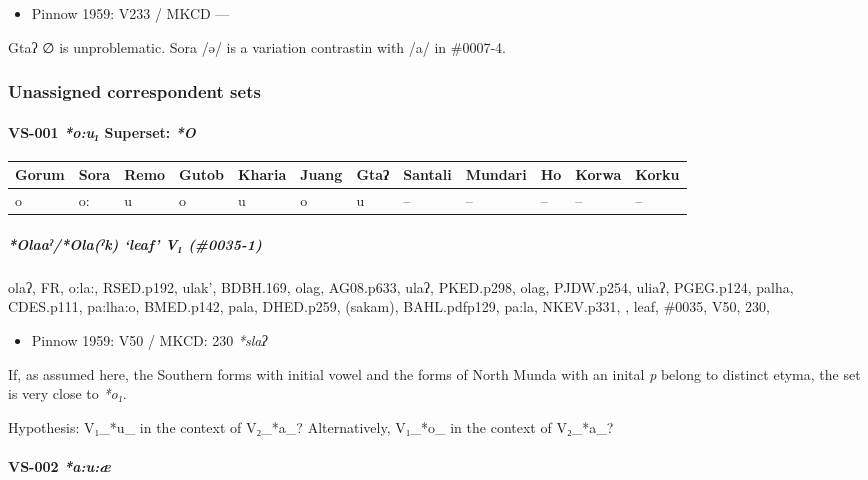 \documentclass[a4paper,]{article}
\providecommand{\tightlist}{%
  \setlength{\itemsep}{0pt}\setlength{\parskip}{0pt}}
\let\oldparagraph\paragraph
\renewcommand{\paragraph}[1]{\oldparagraph{#1}\mbox{}}
\let\oldsubparagraph\subparagraph
\renewcommand{\subparagraph}[1]{\oldsubparagraph{#1}\mbox{}}
\begin{document}
\begin{itemize}
\tightlist
\item
  Pinnow 1959: V233 / MKCD ---
\end{itemize}

Gtaʔ ∅ is unproblematic. Sora /ə/ is a variation contrastin with /a/ in
\#0007-4.

\subsubsection{Unassigned correspondent
sets}\label{unassigned-correspondent-sets}

\paragraph{\texorpdfstring{VS-001 \emph{*o:u₁} Superset:
\emph{*O}}{VS-001 *o:u₁ Superset: *O}}\label{vs-001-ou-superset-o}

\begin{longtable}[]{@{}llllllllllll@{}}
\toprule
Gorum & Sora & Remo & Gutob & Kharia & Juang & Gtaʔ & Santali & Mundari
& Ho & Korwa & Korku\tabularnewline
\midrule
\endhead
o & o: & u & o & u & o & u & -- & -- & -- & -- & --\tabularnewline
\bottomrule
\end{longtable}

\subparagraph{\texorpdfstring{\emph{*Olaaˀ}/\emph{*Ola(ˀk)} `leaf' V₁
(\#0035-1)}{*Olaaˀ/*Ola(ˀk) leaf V₁ (\#0035-1)}}\label{olaaux2c0olaux2c0k-leaf-v-0035-1}

olaʔ, FR, o:la:, RSED.p192, ulak', BDBH.169, olag, AG08.p633, ulaʔ,
PKED.p298, olag, PJDW.p254, uliaʔ, PGEG.p124, palha, CDES.p111,
pa:lha:o, BMED.p142, pala, DHED.p259, (sakam), BAHL.pdfp129, pa:la,
NKEV.p331, , leaf, \#0035, V50, 230,

\begin{itemize}
\tightlist
\item
  Pinnow 1959: V50 / MKCD: 230 \emph{*slaʔ}
\end{itemize}

If, as assumed here, the Southern forms with initial vowel and the forms
of North Munda with an inital \emph{p} belong to distinct etyma, the set
is very close to \emph{*o₁}.

Hypothesis: V₁\_*u\_ in the context of V₂\_*a\_? Alternatively, V₁\_*o\_
in the context of V₂\_*a\_?

\paragraph{\texorpdfstring{VS-002
\emph{*a:u:æ}}{VS-002 *a:u:æ}}\label{vs-002-auuxe6}
\end{document}
